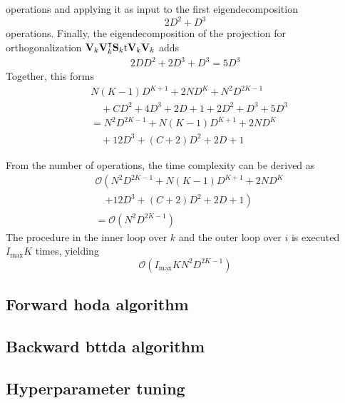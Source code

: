 operations and applying it as input to the first eigendecomposition
\begin{equation}
	2D^2 + 	D^3
\end{equation}
operations.
Finally, the eigendecomposition of the projection for orthogonalization
$\mathbf{V}_k\mathbf{V}_k^\intercal\mathbf{S}_k{\text{t}}\mathbf{V}_k\mathbf{V}_k$
adds
\begin{equation}
	\begin{split}
		2DD^2+ 2D^3 +D^3 = 5D^3
	\end{split}
\end{equation}
Together, this forms
\begin{equation}
	\begin{split}
		& N\left(K-1\right)D^{K+1}
		+ 2ND^K
		+ N^2D^{2K-1} \\
		& \quad + CD^2+4D^3+2D +1
		+ 2D^2+D^3 + 5D^3 \\
		& = N^2D^{2K-1} + N(K-1)D^{K+1} + 2ND^K\\
		& \quad  + 12D^3 + (C+2)D^2 + 2D+1
	\end{split}
\end{equation}

From the number of operations, the time complexity can be derived as
\begin{equation}
	\begin{split}
		& \mathcal{O}\left(N^2D^{2K-1} + N(K-1)D^{K+1} + 2ND^K \right.\\
		& \quad \left. + 12D^3 + (C+2)D^2 + 2D+1\right) \\
		& = \mathcal{O}\left(N^2D^{2K-1}\right)
	\end{split}
\end{equation}
The procedure in the inner loop over $k$ and the outer loop over $i$ is
executed $I_\text{max}K$ times, yielding
\begin{equation}
	\mathcal{O}\left(I_\text{max}KN^2D^{2K-1}\right)
\end{equation}

\subsection{Forward \ac{hoda} algorithm}

\subsection{Backward \ac{bttda} algorithm}

\subsection{Hyperparameter tuning}
